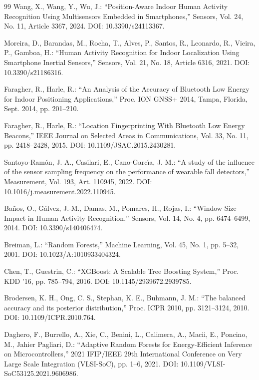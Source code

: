 \documentclass[a4paper,12pt]{jreport}
\begin{document}
\begin{thebibliography}{99}
Wang, X., Wang, Y., Wu, J.: ``Position-Aware Indoor Human Activity Recognition Using Multisensors Embedded in Smartphones,''
Sensors, Vol. 24, No. 11, Article 3367, 2024.
DOI: 10.3390/s24113367.

Moreira, D., Barandas, M., Rocha, T., Alves, P., Santos, R., Leonardo, R., Vieira, P., Gamboa, H.:
``Human Activity Recognition for Indoor Localization Using Smartphone Inertial Sensors,''
Sensors, Vol. 21, No. 18, Article 6316, 2021.
DOI: 10.3390/s21186316.

Faragher, R., Harle, R.: ``An Analysis of the Accuracy of Bluetooth Low Energy for Indoor Positioning Applications,''
Proc. ION GNSS+ 2014, Tampa, Florida, Sept. 2014, pp. 201--210.

Faragher, R., Harle, R.: ``Location Fingerprinting With Bluetooth Low Energy Beacons,''
IEEE Journal on Selected Areas in Communications, Vol. 33, No. 11, pp. 2418--2428, 2015.
DOI: 10.1109/JSAC.2015.2430281.

Santoyo-Ram\'{o}n, J. A., Casilari, E., Cano-Garc\'{\i}a, J. M.:
``A study of the influence of the sensor sampling frequency on the performance of wearable fall detectors,''
Measurement, Vol. 193, Art. 110945, 2022.
DOI: 10.1016/j.measurement.2022.110945.

Ba\~{n}os, O., G\'{a}lvez, J.-M., Damas, M., Pomares, H., Rojas, I.:
``Window Size Impact in Human Activity Recognition,''
Sensors, Vol. 14, No. 4, pp. 6474--6499, 2014.
DOI: 10.3390/s140406474.

Breiman, L.: ``Random Forests,''
Machine Learning, Vol. 45, No. 1, pp. 5--32, 2001.
DOI: 10.1023/A:1010933404324.

Chen, T., Guestrin, C.: ``XGBoost: A Scalable Tree Boosting System,''
Proc. KDD '16, pp. 785--794, 2016.
DOI: 10.1145/2939672.2939785.

Brodersen, K. H., Ong, C. S., Stephan, K. E., Buhmann, J. M.:
``The balanced accuracy and its posterior distribution,''
Proc. ICPR 2010, pp. 3121--3124, 2010.
DOI: 10.1109/ICPR.2010.764.

Daghero, F., Burrello, A., Xie, C., Benini, L., Calimera, A., Macii, E., Poncino, M., Jahier Pagliari, D.:
``Adaptive Random Forests for Energy-Efficient Inference on Microcontrollers,''
2021 IFIP/IEEE 29th International Conference on Very Large Scale Integration (VLSI-SoC),
pp. 1--6, 2021.
DOI: 10.1109/VLSI-SoC53125.2021.9606986.


\end{thebibliography}
\end{document}
